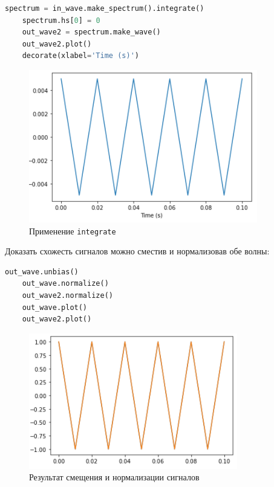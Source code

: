 \documentclass[a4paper]{article}
\begin{document}
\begin{lstlisting}[language=Python, caption= Применение \texttt{integrate}]
    spectrum = in_wave.make_spectrum().integrate()
    spectrum.hs[0] = 0
    out_wave2 = spectrum.make_wave()
    out_wave2.plot()
    decorate(xlabel='Time (s)')
\end{lstlisting}
            
            \begin{figure}[H]
                \centering
                \includegraphics{ex_3_3.png}
                \caption{Применение \texttt{integrate}}
                \label{fig:ex_3_3}
            \end{figure}
            
            Доказать схожесть сигналов можно сместив и нормализовав обе волны:
            
\begin{lstlisting}[language=Python, caption= Смещение и нормализация сигналов]
    out_wave.unbias()
    out_wave.normalize()
    out_wave2.normalize()
    out_wave.plot()
    out_wave2.plot()
\end{lstlisting}
            
            \begin{figure}[H]
                \centering
                \includegraphics{ex_3_4.png}
                \caption{Результат смещения и нормализации сигналов}
                \label{fig:ex_3_4}
            \end{figure}
            
\end{document}
